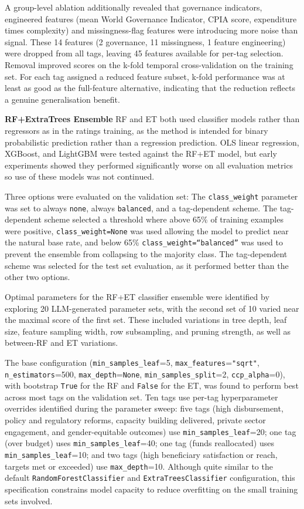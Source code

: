 \documentclass[12pt,a4paper]{article}
\begin{document}
A group-level ablation additionally revealed that governance indicators, engineered features (mean World Governance Indicator, CPIA score, expenditure times complexity) and missingness-flag features were introducing more noise than signal. These 14 features (2 governance, 11 missingness, 1 feature engineering) were dropped from all tags, leaving 45 features available for per-tag selection. Removal improved scores on the k-fold temporal cross-validation on the training set. For each tag assigned a reduced feature subset, k-fold performance was at least as good as the full-feature alternative, indicating that the reduction reflects a genuine generalisation benefit.

\textbf{RF+ExtraTrees Ensemble} \label{sub:treeparamsoutcometags}
RF and ET both used classifier models rather than regressors as in the ratings training, as the method is intended for binary probabilistic prediction rather than a regression prediction. OLS linear regression, XGBoost, and LightGBM were tested against the RF+ET model, but early experiments showed they performed significantly worse on all evaluation metrics so use of these models was not continued.

Three options were evaluated on the validation set: The \texttt{class\_weight} parameter was set to always \texttt{none}, always \texttt{balanced}, and a tag-dependent scheme. The tag-dependent scheme selected a threshold where above 65\% of training examples were positive, \texttt{class\_weight=None} was used allowing the model to predict near the natural base rate, and below 65\% \texttt{class\_weight=``balanced''} was used to prevent the ensemble from collapsing to the majority class. The tag-dependent scheme was selected for the test set evaluation, as it performed better than the other two options.

Optimal parameters for the RF+ET classifier ensemble were identified by exploring 20 LLM-generated parameter sets, with the second set of 10 varied near the maximal score of the first set. These included variations in tree depth, leaf size, feature sampling width, row subsampling, and pruning strength, as well as between-RF and ET variations.

The base configuration (\texttt{min\_samples\_leaf}=5, \texttt{max\_features}=\texttt{"sqrt"}, \texttt{n\_estimators}=500, \texttt{max\_depth}=\texttt{None}, \texttt{min\_samples\_split}=2, \texttt{ccp\_alpha}=0), with bootstrap \texttt{True} for the RF and \texttt{False} for the ET, was found to perform best across most tags on the validation set. Ten tags use per-tag hyperparameter overrides identified during the parameter sweep: five tags (high disbursement, policy and regulatory reforms, capacity building delivered, private sector engagement, and gender-equitable outcomes) use \texttt{min\_samples\_leaf}=20; one tag (over budget) uses \texttt{min\_samples\_leaf}=40; one tag (funds reallocated) uses \texttt{min\_samples\_leaf}=10; and two tags (high beneficiary satisfaction or reach, targets met or exceeded) use \texttt{max\_depth}=10. Although quite similar to the default \texttt{RandomForestClassifier} and \texttt{ExtraTreesClassifier} configuration, this specification constrains model capacity to reduce overfitting on the small training sets involved.
\end{document}
